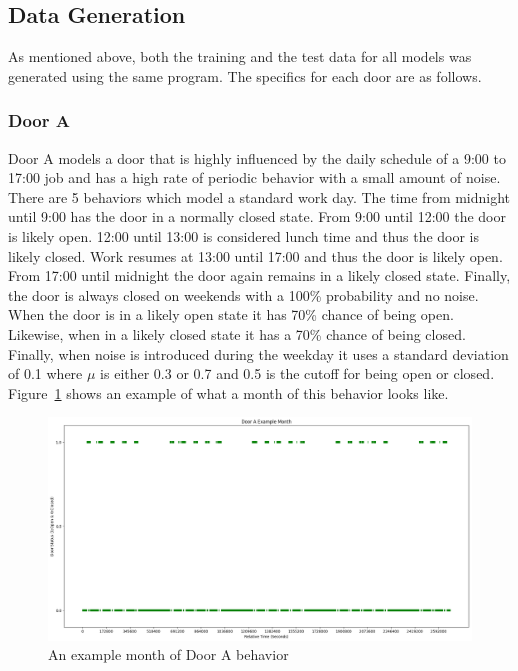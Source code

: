   \subsection{ Data Generation }

  As mentioned above, both the training and the test data for all models was
  generated using the same program. The specifics for each door are as follows.

  \subsubsection{ Door A }

  Door A models a door that is highly influenced by the daily schedule of a
  9:00 to 17:00 job and has a high rate of periodic behavior with a small
  amount of noise. There are 5 behaviors which model a standard work day. The
  time from midnight until 9:00 has the door in a normally closed
  state. From 9:00 until 12:00 the door is likely open. 12:00 until 13:00 is
  considered lunch time and thus the door is likely closed. Work resumes at
  13:00 until 17:00 and thus the door is likely open. From 17:00 until midnight
  the door again remains in a likely closed state. Finally, the door is always
  closed on weekends with a 100\% probability and no noise. \\

  When the door is in a likely open state it has 70\% chance of being open.
  Likewise, when in a likely closed state it has a 70\% chance of being closed.
  Finally, when noise is introduced during the weekday it uses a standard deviation
  of 0.1 where $\mu$ is either 0.3 or 0.7 and 0.5 is the cutoff for being open or
  closed. Figure~\ref{figure:Door_A_example} shows an example of what a
  month of this behavior looks like.\\

  \begin{figure}[!htb]
    \centering
    \includegraphics[width=\linewidth]{images/Door_A_Example_Month.png}
    \caption{An example month of Door A behavior}
    \label{figure:Door_A_example}
  \end{figure}

